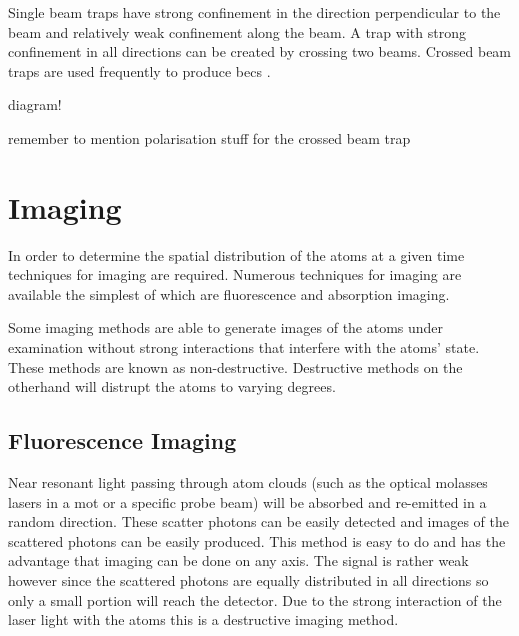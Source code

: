 Single beam traps have strong confinement in the direction perpendicular to the beam and relatively weak confinement along the beam. A trap with strong confinement in all directions can be created by crossing two beams. Crossed beam traps are used frequently to produce \glspl{bec} \cite{couvert_quasi-monomode_2008, arnold_all-optical_2011, fu_bose-einstein_2011, barrett_all-optical_2001, xiong_evaporative_2010}.

{\color{red} diagram!}

{\color{red}remember to mention polarisation stuff for the crossed beam trap}

\section{Imaging}

In order to determine the spatial distribution of the atoms at a given time techniques for imaging are required. Numerous techniques for imaging are available the simplest of which are fluorescence and absorption imaging.

Some imaging methods are able to generate images of the atoms under examination without strong interactions that interfere with the atoms' state. These methods are known as non-destructive. Destructive methods on the otherhand will distrupt the atoms to varying degrees.

\subsection{Fluorescence Imaging}

Near resonant light passing through atom clouds (such as the optical molasses lasers in a \gls{mot} or a specific probe beam) will be absorbed and re-emitted in a random direction. These scatter photons can be easily detected and images of the scattered photons can be easily produced. This method is easy to do and has the advantage that imaging can be done on any axis. The signal is rather weak however since the scattered photons are equally distributed in all directions so only a small portion will reach the detector. Due to the strong interaction of the laser light with the atoms this is a destructive imaging method.

